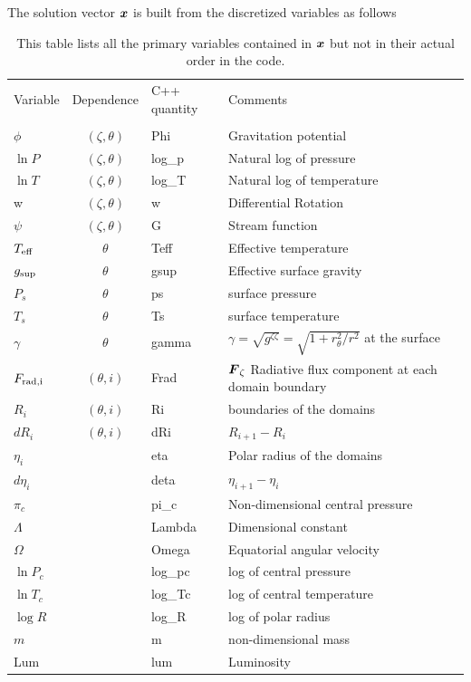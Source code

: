 The solution vector $\vx$ is built from the discretized variables as
follows

\begin{table}
\begin{center}
\begin{tabular}{lcll}
\hline
Variable & Dependence & C++ quantity & Comments \\
\\
$\phi$   & $(\zeta,\theta)$ &  Phi & Gravitation potential \\
$\ln P$  & $(\zeta,\theta)$ &  log\_p & Natural log of pressure     \\
$\ln T$  & $(\zeta,\theta)$ &  log\_T & Natural log of temperature  \\
   w     &  $(\zeta,\theta)$ &   w  & Differential Rotation    \\
$\psi$   &  $(\zeta,\theta)$ &   G  & Stream function    \\
$T_{\rm eff}$ & $\theta$ &  Teff  &  Effective temperature  \\
$g_{\rm sup}$ & $\theta$ &  gsup  &  Effective surface gravity  \\
$P_s$    &  $\theta$  &ps    &  surface pressure \\
$T_s$    &  $\theta$  &Ts    &  surface temperature \\
$\gamma$ &  $\theta$    & gamma    &
$\gamma=\sqrt{g^{\zeta\zeta}}=\sqrt{1+r_\theta^2/r^2}$ at the surface \\
$F_{\rm rad,i}$ &  $(\theta, i)$ &  Frad & $\vF_\zeta$ Radiative flux
component at each domain boundary\\
$R_i$    &  $(\theta,i)$       &   Ri & boundaries of the domains \\
$dR_i$   &  $(\theta,i)$       &   dRi& $R_{i+1}-R_i$      \\
$\eta_i$ &                   &   eta& Polar radius of the domains \\
$d\eta_i$&                   &  deta& $\eta_{i+1}-\eta_i$      \\
$\pi_c$  &                  &  pi\_c &  Non-dimensional central pressure \\
$\Lambda$&                  &  Lambda &   Dimensional constant  \\
$\Omega$ &                  &  Omega  &   Equatorial angular velocity \\
$\ln P_c$&                  & log\_pc &   log of central pressure  \\
$\ln T_c$&                  & log\_Tc &   log of central temperature  \\
$\log R$ &                  &log\_R  &   log of polar radius \\
$m$      &                  &       m     & non-dimensional mass\\
Lum      &                  &  lum   &  Luminosity  \\
      \hline
\end{tabular}
\end{center}
\caption[]
{This table lists all the primary variables contained in $\vx$ but not
in their actual order in the code.}
\end{table}

